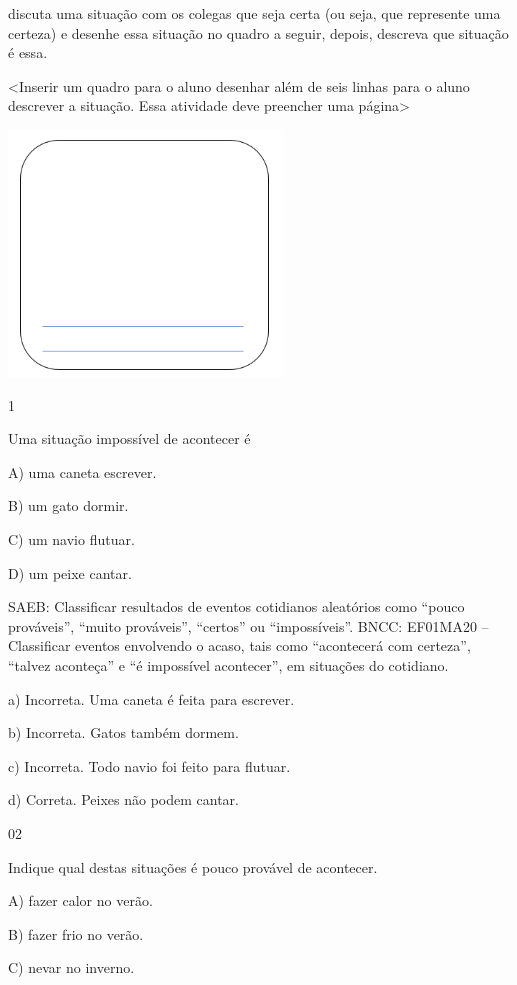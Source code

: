 discuta uma situação com os colegas que seja certa (ou seja, que represente uma certeza) e desenhe essa
situação no quadro a seguir, depois, descreva que situação é essa.

\textless{}Inserir um quadro para o aluno desenhar além de seis linhas
para o aluno descrever a situação. Essa atividade deve preencher uma
página\textgreater{}

\includegraphics[width=2.86272in,height=2.57423in]{media/image92.png}



\num{1}

Uma situação impossível de acontecer é

A) uma caneta escrever.

B) um gato dormir.

C) um navio flutuar.

D) um peixe cantar.

SAEB: Classificar resultados de eventos cotidianos aleatórios como
``pouco prováveis'', ``muito prováveis'', ``certos'' ou ``impossíveis''.
BNCC: EF01MA20 -- Classificar eventos envolvendo o acaso, tais como
``acontecerá com certeza'', ``talvez aconteça'' e ``é impossível
acontecer'', em situações do cotidiano.

a) Incorreta. Uma caneta é feita para escrever.

b) Incorreta. Gatos também dormem.

c) Incorreta. Todo navio foi feito para flutuar.

d) Correta. Peixes não podem cantar.

\num{02}

Indique qual destas situações é pouco provável de acontecer.

A) fazer calor no verão.

B) fazer frio no verão.

C) nevar no inverno.

